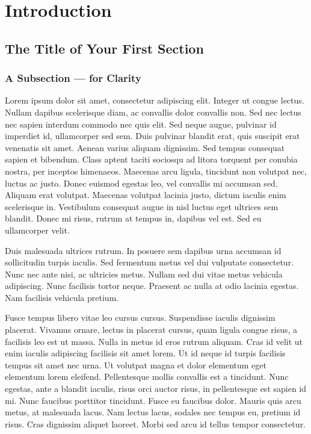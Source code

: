 \chapter{Introduction}
\section{The Title of Your First Section}
\subsection{A Subsection --- for Clarity}
Lorem ipsum dolor sit amet, consectetur adipiscing elit.\cite{pericles} Integer ut congue lectus. Nullam dapibus scelerisque diam, ac convallis dolor convallis non. Sed nec lectus nec sapien interdum commodo nec quis elit. Sed neque augue, pulvinar id imperdiet id, ullamcorper sed sem. Duis pulvinar blandit erat, quis suscipit erat venenatis sit amet. Aenean varius aliquam dignissim. Sed tempus consequat sapien et bibendum. Class aptent taciti sociosqu ad litora torquent per conubia nostra, per inceptos himenaeos. Maecenas arcu ligula, tincidunt non volutpat nec, luctus ac justo. Donec euismod egestas leo, vel convallis mi accumsan sed. Aliquam erat volutpat. Maecenas volutpat lacinia justo, dictum iaculis enim scelerisque in. Vestibulum consequat augue in nisl luctus eget ultrices sem blandit. Donec mi risus, rutrum at tempus in, dapibus vel est. Sed eu ullamcorper velit.\cite{pericles,thekingsenglish}

Duis malesuada ultrices rutrum. In posuere sem dapibus urna accumsan id sollicitudin turpis iaculis. Sed fermentum metus vel dui vulputate consectetur. Nunc nec ante nisi, ac ultricies metus. Nullam sed dui vitae metus vehicula adipiscing. Nunc facilisis tortor neque. Praesent ac nulla at odio lacinia egestas. Nam facilisis vehicula pretium.

Fusce tempus libero vitae leo cursus cursus. Suspendisse iaculis dignissim placerat. Vivamus ornare, lectus in placerat cursus, quam ligula congue risus, a facilisis leo est ut massa. Nulla in metus id eros rutrum aliquam. Cras id velit ut enim iaculis adipiscing facilisis sit amet lorem. Ut id neque id turpis facilisis tempus sit amet nec urna.\cite{bioluminescence:ch1} Ut volutpat magna et dolor elementum eget elementum lorem eleifend. Pellentesque mollis convallis est a tincidunt. Nunc egestas, ante a blandit iaculis, risus orci auctor risus, in pellentesque est sapien id mi. Nunc faucibus porttitor tincidunt.\cite{atkins_inorgchem,atkins_physchem} Fusce eu faucibus dolor. Mauris quis arcu metus, at malesuada lacus. Nam lectus lacus, sodales nec tempus eu, pretium id risus. Cras dignissim aliquet laoreet. Morbi sed arcu id tellus tempor consectetur.\cite{bioluminescence:apA,hori1973}

